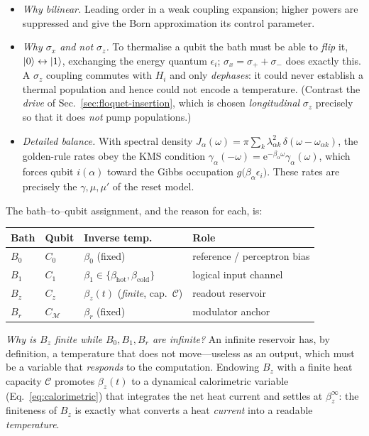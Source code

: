 \documentclass[11pt,a4paper]{article}
\theoremstyle{definition}
\theoremstyle{remark}
\newcommand{\ee}{\mathrm{e}}
\begin{document}
\begin{itemize}
\item \emph{Why bilinear.} Leading order in a weak coupling expansion;
higher powers are suppressed and give the Born approximation its
control parameter.
\item \emph{Why $\sigma_x$ and not $\sigma_z$.} To thermalise a qubit
the bath must be able to \emph{flip} it, $\ket{0}\leftrightarrow\ket{1}$,
exchanging the energy quantum $\epsilon_i$;
$\sigma_x=\sigma_++\sigma_-$ does exactly this. A $\sigma_z$ coupling
commutes with $H_i$ and only \emph{dephases}: it could never establish
a thermal population and hence could not encode a temperature. (Contrast
the \emph{drive} of Sec.~\ref{sec:floquet-insertion}, which is chosen
\emph{longitudinal} $\sigma_z$ precisely so that it does \emph{not} pump
populations.)
\item \emph{Detailed balance.} With spectral density
$J_\alpha(\omega)=\pi\sum_k\lambda_{\alpha k}^2\,
\delta(\omega-\omega_{\alpha k})$, the golden-rule rates obey the KMS
condition $\gamma_\alpha(-\omega)=\ee^{-\beta_\alpha\omega}
\gamma_\alpha(\omega)$, which forces qubit $i(\alpha)$ toward the Gibbs
occupation $g\big(\beta_\alpha\epsilon_{i}\big)$. These rates are
precisely the $\gamma,\mu,\mu'$ of the reset model.
\end{itemize}
The bath--to--qubit assignment, and the reason for each, is:
\begin{center}
\begin{tabular}{@{}llll@{}}
\toprule
Bath & Qubit & Inverse temp. & Role \\
\midrule
$B_0$ & $C_0$ & $\beta_0$ (fixed) & reference / perceptron bias \\
$B_1$ & $C_1$ & $\beta_1\in\{\beta_{\mathrm{hot}},\beta_{\mathrm{cold}}\}$
& logical input channel \\
$B_z$ & $C_z$ & $\beta_z(t)$ (\emph{finite}, cap.\ $\mathcal{C}$)
& readout reservoir \\
$B_r$ & $C_\mathcal{M}$ & $\beta_r$ (fixed) & modulator anchor \\
\bottomrule
\end{tabular}
\end{center}
\emph{Why is $B_z$ finite while $B_0,B_1,B_r$ are infinite?} An infinite
reservoir has, by definition, a temperature that does not move---useless
as an output, which must be a variable that \emph{responds} to the
computation. Endowing $B_z$ with a finite heat capacity $\mathcal{C}$
promotes $\beta_z(t)$ to a dynamical calorimetric variable
(Eq.~\eqref{eq:calorimetric}) that integrates the net heat current and
settles at $\beta_z^\infty$: the finiteness of $B_z$ is exactly what
converts a heat \emph{current} into a readable \emph{temperature}.
\end{document}
